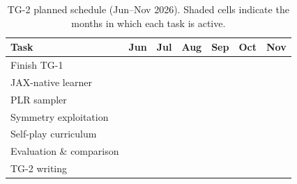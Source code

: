\begin{table}[ht]
    \centering
    \caption{TG-2 planned schedule (Jun--Nov 2026).  Shaded cells indicate the
    months in which each task is active.}
    \label{tab:gantt}
    \setlength{\tabcolsep}{6pt}
    \begin{tabular}{l|cccccc}
        \toprule
        \textbf{Task} & \textbf{Jun} & \textbf{Jul} & \textbf{Aug} & \textbf{Sep} & \textbf{Oct} & \textbf{Nov} \\
        \midrule
        Finish TG-1               & \cellcolor{ganttblue!70} &                          &                          &                          &                          &                          \\
        JAX-native learner        & \cellcolor{ganttblue!70} & \cellcolor{ganttblue!70} &                          &                          &                          &                          \\
        PLR sampler               &                          & \cellcolor{ganttblue!70} &                          &                          &                          &                          \\
        Symmetry exploitation     &                          & \cellcolor{ganttblue!70} & \cellcolor{ganttblue!70} &                          &                          &                          \\
        Self-play curriculum      &                          & \cellcolor{ganttblue!70} & \cellcolor{ganttblue!70} &                          &                          &                          \\
        Evaluation \& comparison  &                          &                          & \cellcolor{ganttblue!70} & \cellcolor{ganttblue!70} & \cellcolor{ganttblue!70} & \cellcolor{ganttblue!70} \\
        TG-2 writing              &                          &                          &                          &                          & \cellcolor{ganttblue!70} & \cellcolor{ganttblue!70} \\
        \bottomrule
    \end{tabular}
\end{table}